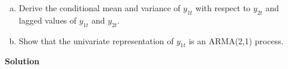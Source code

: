 %

\begin{enumerate}[(a)]

\item Derive the conditional mean and variance of \(y_{1t}\) with respect to \(y_{2t}\) and lagged values of \(y_{1t}\) and \(y_{2t}\).

\item Show that the univariate representation of \(y_{1t}\) is an ARMA(2,1) process.

\end{enumerate}

\textbf{Solution} 


